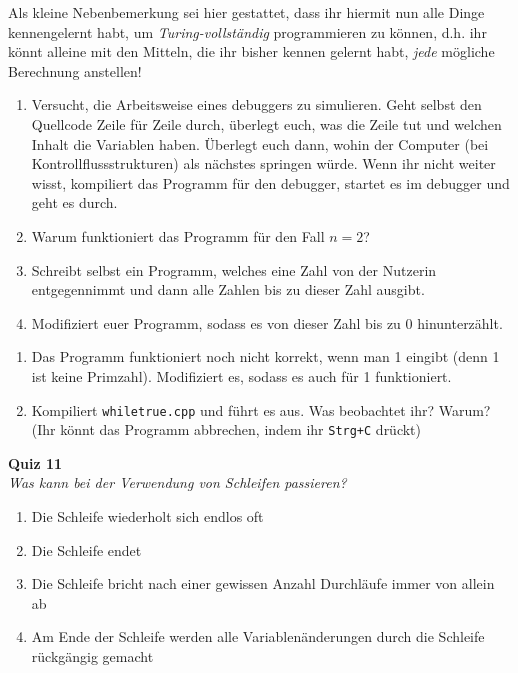 Als kleine Nebenbemerkung sei hier gestattet, dass ihr hiermit nun alle Dinge
kennengelernt habt, um \emph{Turing-vollständig} programmieren zu können, d.h.
ihr könnt alleine mit den Mitteln, die ihr bisher kennen gelernt habt,
\emph{jede} mögliche Berechnung anstellen!

\begin{praxis}
      \begin{enumerate}
            \item Versucht, die Arbeitsweise eines debuggers zu simulieren. Geht selbst
                  den Quellcode Zeile für Zeile durch, überlegt euch, was die Zeile tut
                  und welchen Inhalt die Variablen haben. Überlegt euch dann, wohin der
                  Computer (bei Kontrollflussstrukturen) als nächstes springen würde.
                  Wenn ihr nicht weiter wisst, kompiliert das Programm für den debugger,
                  startet es im debugger und geht es durch.
            \item Warum funktioniert das Programm für den Fall $n = 2$?
            \item Schreibt selbst ein Programm, welches eine Zahl von der Nutzerin
                  entgegennimmt und dann alle Zahlen bis zu dieser Zahl ausgibt.
            \item Modifiziert euer Programm, sodass es von dieser Zahl bis zu 0
                  hinunterzählt.
      \end{enumerate}
\end{praxis}

\begin{spiel}
      \begin{enumerate}
            \item Das Programm funktioniert noch nicht korrekt, wenn man 1 eingibt
                  (denn 1 ist keine Primzahl). Modifiziert es, sodass es auch für 1
                  funktioniert.
            \item Kompiliert \texttt{whiletrue.cpp} und führt es aus. Was beobachtet
                  ihr? Warum? (Ihr könnt das Programm abbrechen, indem ihr
                  \texttt{Strg+C} drückt)
      \end{enumerate}
  \end{spiel}

\textbf{Quiz 11}\\
\textit{Was kann bei der Verwendung von Schleifen passieren?}
\begin{enumerate}[label=\alph]
    \item Die Schleife wiederholt sich endlos oft
    \item Die Schleife endet
    \item Die Schleife bricht nach einer gewissen Anzahl Durchläufe immer von allein ab
    \item Am Ende der Schleife werden alle Variablenänderungen durch die Schleife rückgängig gemacht
\end{enumerate}
